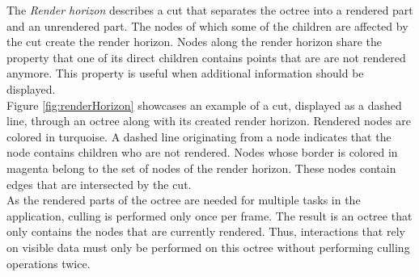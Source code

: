 The \textit{Render horizon} describes a cut that separates the octree into a rendered part and an unrendered part. The nodes of which some of the children are affected by the cut create the render horizon. Nodes along the render horizon share the property that one of its direct children contains points that are are not rendered anymore. This property is useful when additional information should be displayed. 
\\
Figure \ref{fig:renderHorizon} showcases an example of a cut, displayed as a dashed line, through an octree along with its created render horizon. Rendered nodes are colored in turquoise. A dashed line originating from a node indicates that the node contains children who are not rendered. Nodes whose border is colored in magenta belong to the set of nodes of the render horizon. These nodes contain edges that are intersected by the cut. 
\\
As the rendered parts of the octree are needed for multiple tasks in the application, culling is performed only once per frame. The result is an octree that only contains the nodes that are currently rendered. Thus, interactions that rely on visible data must only be performed on this octree without performing culling operations twice. 